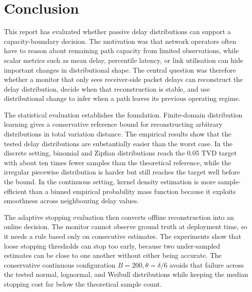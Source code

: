 \documentclass[a4paper,11pt]{report}
\begin{document}
\chapter{Conclusion}

This report has evaluated whether passive delay distributions can support a capacity-boundary decision. The motivation was that network operators often have to reason about remaining path capacity from limited observations, while scalar metrics such as mean delay, percentile latency, or link utilisation can hide important changes in distributional shape. The central question was therefore whether a monitor that only sees receiver-side packet delays can reconstruct the delay distribution, decide when that reconstruction is stable, and use distributional change to infer when a path leaves its previous operating regime.

The statistical evaluation establishes the foundation. Finite-domain distribution learning gives a conservative reference bound for reconstructing arbitrary distributions in total variation distance. The empirical results show that the tested delay distributions are substantially easier than the worst case. In the discrete setting, binomial and Zipfian distributions reach the 0.05 TVD target with about ten times fewer samples than the theoretical reference, while the irregular piecewise distribution is harder but still reaches the target well before the bound. In the continuous setting, kernel density estimation is more sample-efficient than a binned empirical probability mass function because it exploits smoothness across neighbouring delay values.

The adaptive stopping evaluation then converts offline reconstruction into an online decision. The monitor cannot observe ground truth at deployment time, so it needs a rule based only on consecutive estimates. The experiments show that loose stopping thresholds can stop too early, because two under-sampled estimates can be close to one another without either being accurate. The conservative continuous configuration \(B=200,\theta=\delta/6\) avoids that failure across the tested normal, lognormal, and Weibull distributions while keeping the median stopping cost far below the theoretical sample count.
\end{document}
